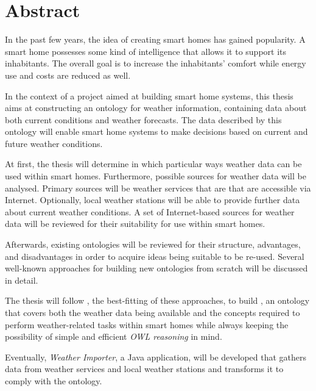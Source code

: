 \chapter*{Abstract}

In the past few years, the idea of creating smart homes has gained popularity. A smart home possesses some kind of intelligence that allows it to support its inhabitants. The overall goal is to increase the inhabitants' comfort while energy use and costs are reduced as well.

In the context of a project aimed at building smart home systems, this thesis aims at constructing an  ontology for weather information, containing data about both current conditions and weather forecasts. The data described by this ontology will enable smart home systems to make decisions based on current and future weather conditions.

At first, the thesis will determine in which particular ways weather data can be used within smart homes. Furthermore, possible sources for weather data will be analysed. Primary sources will be weather services that are that are accessible via Internet. Optionally, local weather stations will be able to provide further data about current weather conditions. A set of Internet-based sources for weather data will be reviewed for their suitability for use within smart homes.

Afterwards, existing ontologies will be reviewed for their structure, advantages, and disadvantages in order to acquire ideas being suitable to be re-used. Several well-known approaches for building new ontologies from scratch will be discussed in detail.

The thesis will follow \methontology, the best-fitting of these approaches, to build \smarthomeweather, an  ontology that covers both the weather data being available and the concepts required to perform weather-related tasks within smart homes while always keeping the possibility of simple and efficient \emph{\acs{OWL} reasoning} in mind.

Eventually, \emph{Weather Importer}, a Java application, will be developed that gathers data from weather services and local weather stations and transforms it to comply with the \smarthomeweather ontology.
